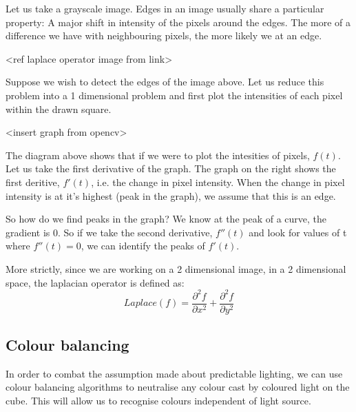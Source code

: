 \documentclass[titlepage]{report}[12pt]
\begin{document}
Let us take a grayscale image. Edges in an image usually share a particular property: A major shift in intensity of the pixels around the edges. The more of a difference we have with neighbouring pixels, the more likely we at an edge. 

<ref laplace operator image from link>

Suppose we wish to detect the edges of the image above. Let us reduce this problem into a 1 dimensional problem and first plot the intensities of each pixel within the drawn square.

<insert graph from opencv>

The diagram above shows that if we were to plot the intesities of pixels, \begin{math}f(t)\end{math}. Let us take the first derivative of the graph. The graph on the right shows the first deritive, \begin{math}f'(t)\end{math}, i.e. the change in pixel intensity. When the change in pixel intensity is at it's highest (peak in the graph), we assume that this is an edge.

So how do we find peaks in the graph? We know at the peak of a curve, the gradient is 0. So if we take the second derivative, \begin{math}f''(t)\end{math} and look for values of t where \begin{math}f''(t) = 0\end{math}, we can identify the peaks of \begin{math}f'(t)\end{math}.

More strictly, since we are working on a 2 dimensional image, in a 2 dimensional space, the laplacian operator is defined as:
\begin{equation}
Laplace(f) = \frac{\partial ^2f}{\partial x^2} + \frac{\partial ^2f}{\partial y^2}
\end{equation}

\subsection{Colour balancing}
In order to combat the assumption made about predictable lighting, we can use colour balancing algorithms to neutralise any colour cast by coloured light on the cube. This will allow us to recognise colours independent of light source.
\end{document}
